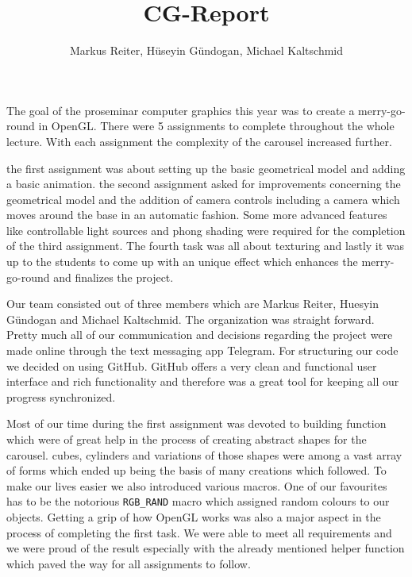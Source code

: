 \documentclass{report}
\title{CG-Report}
\author{Markus Reiter, Hüseyin Gündogan, Michael Kaltschmid}
\begin{document}
\maketitle

The goal of the proseminar computer graphics this year was to create a merry-go-round in OpenGL. There were 5 assignments to complete throughout the whole lecture. With each assignment the complexity of the carousel increased further. 
\par
the first assignment was about setting up the basic geometrical model and adding a basic animation. the second assignment asked for improvements concerning the geometrical model and the addition of camera controls including a camera which moves around the base in an automatic fashion. Some more advanced features like controllable light sources and phong shading were required for the completion of the third assignment. The fourth task was all about texturing and lastly it was up to the students to come up with an unique effect which enhances the merry-go-round and finalizes the project.
\par
Our team consisted out of three members which are Markus Reiter, Huesyin Gündogan and Michael Kaltschmid. The organization was straight forward. Pretty much all of our communication and decisions regarding the project were made online through the text messaging app Telegram. For structuring our code we decided on using GitHub. GitHub offers a very clean and functional user interface and rich functionality and therefore was a great tool for keeping all our progress synchronized. 
\par
Most of our time during the first assignment was devoted to building function which were of great help in the process of creating abstract shapes for the carousel. cubes, cylinders and variations of those shapes were among a vast array of forms which ended up being the basis of many creations which followed. To make our lives easier we also introduced various macros. One of our favourites has to be the notorious \texttt{RGB\_RAND} macro which assigned random colours to our objects. Getting a grip of how OpenGL works was also a major aspect in the process of completing the first task. We were able to meet all requirements and we were proud of the result especially with the already mentioned helper function which paved the way for all assignments to follow.
\par
\end{document}
